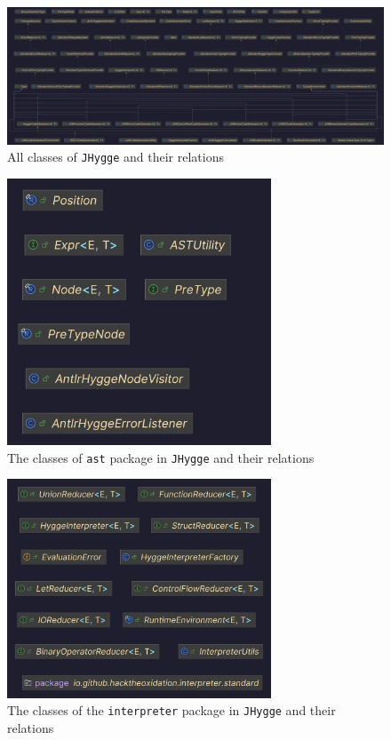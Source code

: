 \begin{figure}[H]
\centering
\includegraphics[width=\textwidth]{Pictures/Diagrams/jhygge_all_classes.png}
\caption{All classes of \texttt{JHygge} and their relations}
\label{fig:jhygge_all_classes}
\end{figure}

\begin{figure}[H]
\centering
\includegraphics[width=0.7\textwidth]{Pictures/Diagrams/ast_classes.png}
\caption{The classes of \texttt{ast} package in \texttt{JHygge} and their relations}
\label{fig:ast_classes}
\end{figure}

\begin{figure}[H]
\centering
\includegraphics[width=0.7\textwidth]{Pictures/Diagrams/interpreter_classes.png}
\caption{The classes of the \texttt{interpreter} package in \texttt{JHygge} and their relations}
\label{fig:interpreter_classes}
\end{figure}

